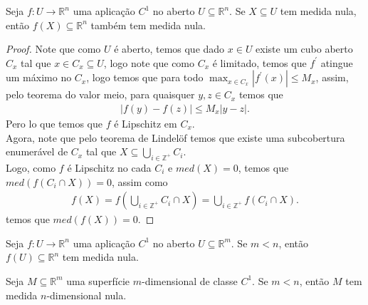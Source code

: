 \begin{theorem}
  Seja $f:U\to\mathbb{R}^{n}$ uma aplicação $C^{1}$ no aberto $U\subseteq \mathbb{R}^{n}$. Se $X\subseteq U$ tem medida nula, então $f(X)\subseteq\mathbb{R}^{n}$ também tem medida nula. 
\end{theorem}
\begin{proof} 
  Note que como $U$ é aberto, temos que dado $x\in U$ existe um cubo aberto $C_{x}$ tal que $x\in C_x\subseteq U$, logo note que como $C_x$ é limitado, temos que $f^{\prime}$ atingue um máximo no $C_x$, logo temos que para todo $\max_{x\in C_x}|f^{\prime}(x)|\leq M_x$, assim, pelo teorema do valor meio, para quaisquer $y,z\in C_x$ temos que
  \begin{align*}
    |f(y)-f(z)|\leq M_x|y-z|.
  \end{align*}
  Pero lo que temos que $f$ é Lipschitz em $C_x$.\\
  Agora, note que pelo teorema de Lindelöf temos que existe uma subcobertura enumerável de $C_x$ tal que $X\subseteq \bigcup_{i\in\mathbb{Z}^{+}}C_i$.\\
  Logo, como $f$ é Lipschitz no cada $C_i$ e $med(X)=0$, temos que $med(f(C_i\cap X))=0$, assim como
  \begin{align*}
    f(X)=f\left( \bigcup_{i\in\mathbb{Z}^{+}}C_i\cap X \right)=\bigcup_{i\in\mathbb{Z}^{+}}f(C_i\cap X).
  \end{align*}
  temos que $med(f(X))=0$.
\end{proof}
\begin{corollary}
  Seja $f:U\to\mathbb{R}^{n}$ uma aplicação $C^{1}$ no aberto $U\subseteq\mathbb{R}^{m}$. Se $m<n$, então $f(U)\subseteq\mathbb{R}^{n}$ tem medida nula. 
\end{corollary}
\begin{corollary}
  Seja $M\subseteq\mathbb{R}^{m}$ uma superfície $m$-dimensional de classe $C^{1}$. Se $m<n$, então $M$ tem medida $n$-dimensional nula. 
\end{corollary}
